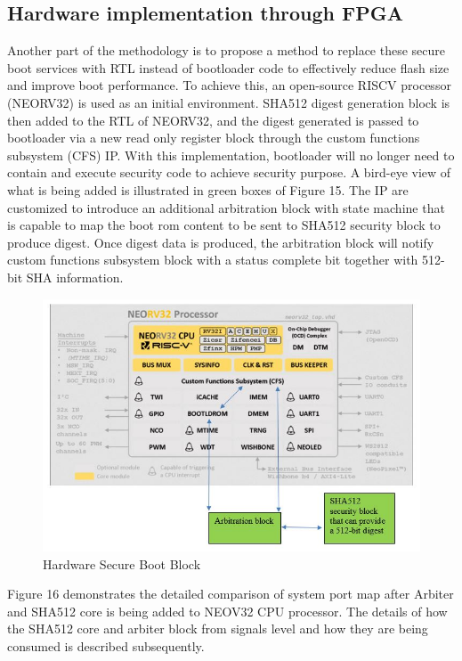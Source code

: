 \documentclass[review]{elsarticle}
\begin{document}
\subsection{ Hardware implementation through FPGA}
Another part of the methodology is to propose a method to replace these secure boot services with RTL instead of bootloader code to effectively reduce flash size and improve boot performance. To achieve this, an open-source RISCV processor (NEORV32) is used as an initial environment. SHA512 digest generation block is then added to the RTL of NEORV32, and the digest generated is passed to bootloader via a new read only register block through the custom functions subsystem (CFS) IP. With this implementation, bootloader will no longer need to contain and execute security code to achieve security purpose. A bird-eye view of what is being added is illustrated in green boxes of Figure 15. The IP are customized to introduce an additional arbitration block with state machine that is capable to map the boot rom content to be sent to SHA512 security block to produce digest. Once digest data is produced, the arbitration block will notify custom functions subsystem block with a status complete bit together with 512-bit SHA information. 

\begin{figure}[hbt!]
	\centering
	\includegraphics[width=1\textwidth]{figs/HardwareSecureBootBlock.JPG}
	\caption{Hardware Secure Boot Block}
\end{figure}


Figure 16 demonstrates the detailed comparison of system port map after Arbiter and SHA512 core is being added to NEOV32 CPU processor. The details of how the SHA512 core and arbiter block from signals level and how they are being consumed is described subsequently.
\end{document}
